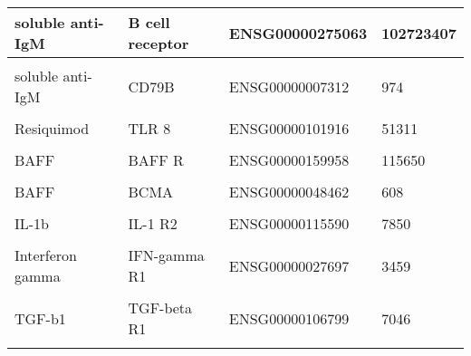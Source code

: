 \documentclass[11pt, a4paper, twosided]{book}
\begin{document}
\begin{table}
\begin{tabular}{l|l|l|l}
\hline
soluble anti-IgM & B cell receptor & ENSG00000275063 & 102723407\\
\hline
\cellcolor[HTML]{E2E868}{soluble anti-IgM} & \cellcolor[HTML]{E2E868}{CD79A} & \cellcolor[HTML]{E2E868}{ENSG00000105369} & \cellcolor[HTML]{E2E868}{973}\\
\hline
soluble anti-IgM & CD79B & ENSG00000007312 & 974\\
\hline
\cellcolor[HTML]{E2E868}{Resiquimod} & \cellcolor[HTML]{E2E868}{TLR 7} & \cellcolor[HTML]{E2E868}{ENSG00000196664} & \cellcolor[HTML]{E2E868}{51284 }\\
\hline
Resiquimod & TLR 8 & ENSG00000101916 & 51311\\
\hline
\cellcolor[HTML]{E2E868}{CpG ODN} & \cellcolor[HTML]{E2E868}{TLR9} & \cellcolor[HTML]{E2E868}{ENSG00000239732} & \cellcolor[HTML]{E2E868}{54106}\\
\hline
BAFF & BAFF R & ENSG00000159958 & 115650\\
\hline
\cellcolor[HTML]{E2E868}{BAFF} & \cellcolor[HTML]{E2E868}{TACI} & \cellcolor[HTML]{E2E868}{ENSG00000240505} & \cellcolor[HTML]{E2E868}{23495}\\
\hline
BAFF & BCMA & ENSG00000048462 & 608\\
\hline
\cellcolor[HTML]{E2E868}{IL-1b} & \cellcolor[HTML]{E2E868}{IL-1 R1} & \cellcolor[HTML]{E2E868}{ENSG00000115594} & \cellcolor[HTML]{E2E868}{3554}\\
\hline
IL-1b & IL-1 R2 & ENSG00000115590 & 7850\\
\hline
\cellcolor[HTML]{E2E868}{sCD40L} & \cellcolor[HTML]{E2E868}{CD40} & \cellcolor[HTML]{E2E868}{ENSG00000101017} & \cellcolor[HTML]{E2E868}{958}\\
\hline
Interferon gamma & IFN-gamma R1 & ENSG00000027697 & 3459\\
\hline
\cellcolor[HTML]{E2E868}{Interferon gamma} & \cellcolor[HTML]{E2E868}{IFN-gamma R2} & \cellcolor[HTML]{E2E868}{ENSG00000159128} & \cellcolor[HTML]{E2E868}{3460}\\
\hline
TGF-b1 & TGF-beta R1 & ENSG00000106799 & 7046\\
\hline
\cellcolor[HTML]{E2E868}{TGF-b1} & \cellcolor[HTML]{E2E868}{TGF-beta R2} & \cellcolor[HTML]{E2E868}{ENSG00000163513} & \cellcolor[HTML]{E2E868}{7048}\\
\hline
\end{tabular}
\end{table}
\end{document}
